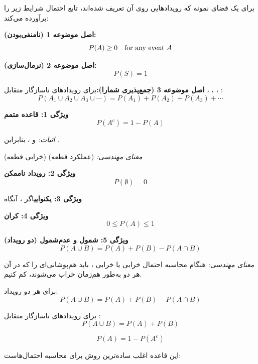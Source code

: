 

برای یک فضای نمونه  که رویدادهایی روی آن تعریف شده‌اند، تابع احتمال  شرایط زیر را برآورده می‌کند:

\textbf{اصل موضوعه 1 (نامنفی‌بودن):}\PSbr{}\[P(A) \geq 0 \quad \text{for any event } A\]

\textbf{اصل موضوعه 2 (نرمال‌سازی):}\PSbr{}\[P(S) = 1\]

\textbf{اصل موضوعه 3 (جمع‌پذیری شمارا):}\PSbr{}برای رویدادهای ناسازگار متقابل ، ، ، :\PSbr{}\[P(A_1 \cup A_2 \cup A_3 \cup \cdots) = P(A_1) + P(A_2) + P(A_3) + \cdots\]


\textbf{ویژگی 1: قاعده متمم}\PSbr{}\[P(A^c) = 1 - P(A)\]

\emph{اثبات:}  و ، بنابراین .

\emph{معنای مهندسی:} (عملکرد قطعه) (خرابی قطعه)

\textbf{ویژگی 2: رویداد ناممکن}\PSbr{}\[P(\emptyset) = 0\]

\textbf{ویژگی 3: یکنوایی}\PSbr{}اگر ، آنگاه 

\textbf{ویژگی 4: کران}\PSbr{}\[0 \leq P(A) \leq 1\]

\textbf{ویژگی 5: شمول و عدم‌شمول (دو رویداد)}\PSbr{}\[P(A \cup B) = P(A) + P(B) - P(A \cap B)\]

\emph{معنای مهندسی:} هنگام محاسبه احتمال خرابی  یا خرابی ، باید هم‌پوشانی‌ای را که در آن هر دو به‌طور هم‌زمان خراب می‌شوند، کم کنیم.



برای هر دو رویداد:\PSbr{}\[P(A \cup B) = P(A) + P(B) - P(A \cap B)\]

برای رویدادهای ناسازگار متقابل :\PSbr{}\[P(A \cup B) = P(A) + P(B)\]


\[P(A) = 1 - P(A^c)\]

این قاعده اغلب ساده‌ترین روش برای محاسبه احتمال‌هاست:

